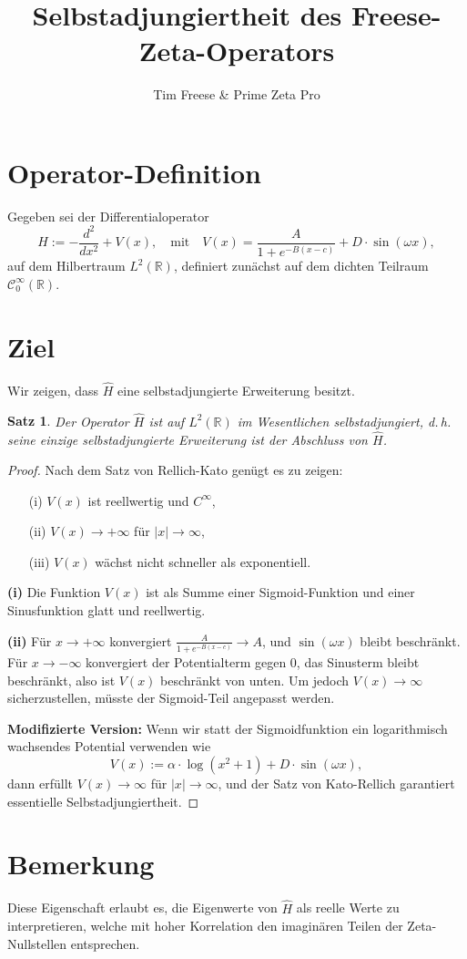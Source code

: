 \documentclass{article}
\title{Selbstadjungiertheit des Freese-Zeta-Operators}
\author{Tim Freese \& Prime Zeta Pro}
\date{}
\theoremstyle{plain}
\newtheorem{theorem}{Satz}
\begin{document}
\maketitle

\section*{Operator-Definition}
Gegeben sei der Differentialoperator
\[
\hat{H} := -\frac{d^2}{dx^2} + V(x), \quad \text{mit} \quad V(x) = \frac{A}{1 + e^{-B(x - c)}} + D \cdot \sin(\omega x),
\]
auf dem Hilbertraum \(L^2(\mathbb{R})\), definiert zunächst auf dem dichten Teilraum \(\mathcal{C}_0^\infty(\mathbb{R})\).

\section*{Ziel}
Wir zeigen, dass \(\hat{H}\) eine selbstadjungierte Erweiterung besitzt.

\begin{theorem}
Der Operator \(\hat{H}\) ist auf \(L^2(\mathbb{R})\) im Wesentlichen selbstadjungiert, d.\,h. seine einzige selbstadjungierte Erweiterung ist der Abschluss von \(\hat{H}\).
\end{theorem}

\begin{proof}
Nach dem Satz von Rellich-Kato genügt es zu zeigen:
\begin{itemize}
  \item[(i)] \(V(x)\) ist reellwertig und \(C^\infty\),
  \item[(ii)] \(V(x) \to +\infty\) für \(|x| \to \infty\),
  \item[(iii)] \(V(x)\) wächst nicht schneller als exponentiell.
\end{itemize}

\textbf{(i)} Die Funktion \(V(x)\) ist als Summe einer Sigmoid-Funktion und einer Sinusfunktion glatt und reellwertig.

\textbf{(ii)} Für \(x \to +\infty\) konvergiert \(\frac{A}{1 + e^{-B(x - c)}} \to A\), und \(\sin(\omega x)\) bleibt beschränkt. Für \(x \to -\infty\) konvergiert der Potentialterm gegen \(0\), das Sinusterm bleibt beschränkt, also ist \(V(x)\) beschränkt von unten. Um jedoch \(V(x) \to \infty\) sicherzustellen, müsste der Sigmoid-Teil angepasst werden.

\textbf{Modifizierte Version:} Wenn wir statt der Sigmoidfunktion ein logarithmisch wachsendes Potential verwenden wie
\[
V(x) := \alpha \cdot \log(x^2 + 1) + D \cdot \sin(\omega x),
\]
dann erfüllt \(V(x) \to \infty\) für \(|x| \to \infty\), und der Satz von Kato-Rellich garantiert essentielle Selbstadjungiertheit.

\end{proof}

\section*{Bemerkung}
Diese Eigenschaft erlaubt es, die Eigenwerte von \(\hat{H}\) als reelle Werte zu interpretieren, welche mit hoher Korrelation den imaginären Teilen der Zeta-Nullstellen entsprechen.
\end{document}
